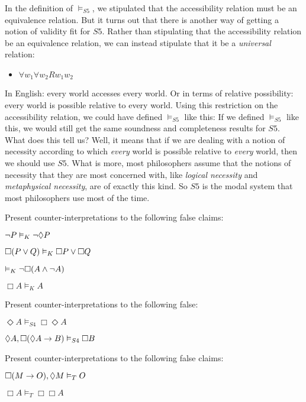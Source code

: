 In the definition of $\vDash_{S5}$, we stipulated that the accessibility relation must be an equivalence relation. But it turns out that there is another way of getting a notion of validity fit for $S5$. Rather than stipulating that the accessibility relation be an equivalence relation, we can instead stipulate that it be a \emph{universal} relation:
\begin{itemize}
\item $\forall w_1\forall w_2Rw_1w_2$
\end{itemize}
In English: every world accesses every world. Or in terms of relative possibility: every world is possible relative to every world. Using this restriction on the accessibility relation, we could have defined $\vDash_{S5}$ like this:
If we defined $\vDash_{S5}$ like this, we would still get the same soundness and completeness results for $S5$. What does this tell us? Well, it means that if we are dealing with a notion of necessity according to which \emph{every} world is possible relative to \emph{every} world, then we should use $S5$. What is more, most philosophers assume that the notions of necessity that they are most concerned with, like \emph{logical necessity} and \emph{metaphysical necessity}, are of exactly this kind. So $S5$ is the modal system that most philosophers use most of the time.

\practiceproblems

\problempart
Present counter-interpretations to the following false claims:
\begin{earg}
\item $\neg P \vDash_K \neg\Diamond P$
\item $\Box(P \vee Q)\vDash_K \Box P \vee \Box Q$
\item $\vDash_K \neg \Box (A\wedge \neg A)$
\item $\Box A\vDash_K A$
\end{earg}

\problempart
Present counter-interpretations to the following false:
\begin{earg}
\item $\Diamond A\vDash_{S4} \Box\Diamond A$
\item $\Diamond A, \Box (\Diamond A \rightarrow B)\vDash_{S4}\Box B$
\end{earg}

\problempart
Present counter-interpretations to the following false claims:
\begin{earg}
\item $\Box (M\rightarrow O),\Diamond M\vDash_T O$
\item $\Box A\vDash_T \Box \Box A$
\end{earg}

